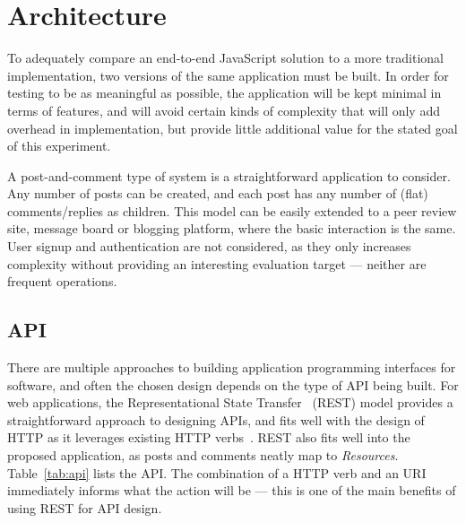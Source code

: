 \documentclass[letterpaper,twocolumn,10pt,draft]{article}
\begin{document}
\section{\label{sec:arch}Architecture}

To adequately compare an end-to-end JavaScript solution to a more traditional implementation, two versions of the same application must be built. In order for testing to be as meaningful as possible, the application will be kept minimal in terms of features, and will avoid certain kinds of complexity that will only add overhead in implementation, but provide little additional value for the stated goal of this experiment.

A post-and-comment type of system is a straightforward application to consider. Any number of posts can be created, and each post has any number of (flat) comments/replies as children. This model can be easily extended to a peer review site, message board or blogging platform, where the basic interaction is the same. User signup and authentication are not considered, as they only increases complexity without providing an interesting evaluation target --- neither are frequent operations.

\subsection{\label{sec:arch:API}API}

There are multiple approaches to building application programming interfaces for software, and often the chosen design depends on the type of API being built. For web applications, the Representational State Transfer~\cite{restful} (REST) model provides a straightforward approach to designing APIs, and fits well with the design of HTTP as it leverages existing HTTP verbs~\cite{rfc2616}. REST also fits well into the proposed application, as posts and comments neatly map to \emph{Resources}. Table~\ref{tab:api} lists the API. The combination of a HTTP verb and an URI immediately informs what the action will be --- this is one of the main benefits of using REST for API design.
\end{document}
